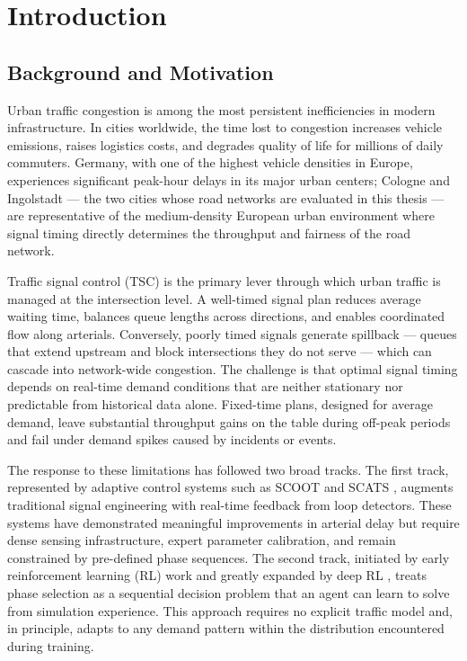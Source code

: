\chapter{Introduction}
\label{ch:Introduction}

\section{Background and Motivation}
\label{sec:Introduction_BackgroundAndMotivation}

Urban traffic congestion is among the most persistent inefficiencies in modern infrastructure. In cities worldwide, the time lost to congestion increases vehicle emissions, raises logistics costs, and degrades quality of life for millions of daily commuters. Germany, with one of the highest vehicle densities in Europe, experiences significant peak-hour delays in its major urban centers; Cologne and Ingolstadt — the two cities whose road networks are evaluated in this thesis — are representative of the medium-density European urban environment where signal timing directly determines the throughput and fairness of the road network.

Traffic signal control (TSC) is the primary lever through which urban traffic is managed at the intersection level. A well-timed signal plan reduces average waiting time, balances queue lengths across directions, and enables coordinated flow along arterials. Conversely, poorly timed signals generate spillback — queues that extend upstream and block intersections they do not serve — which can cascade into network-wide congestion. The challenge is that optimal signal timing depends on real-time demand conditions that are neither stationary nor predictable from historical data alone. Fixed-time plans, designed for average demand, leave substantial throughput gains on the table during off-peak periods and fail under demand spikes caused by incidents or events.

The response to these limitations has followed two broad tracks. The first track, represented by adaptive control systems such as SCOOT \citep{hunt1981scoot} and SCATS \citep{lowrie1990scats}, augments traditional signal engineering with real-time feedback from loop detectors. These systems have demonstrated meaningful improvements in arterial delay but require dense sensing infrastructure, expert parameter calibration, and remain constrained by pre-defined phase sequences. The second track, initiated by early reinforcement learning (RL) work \citep{wiering2000multiagent} and greatly expanded by deep RL \citep{wei2018intellilight,wei2019presslight}, treats phase selection as a sequential decision problem that an agent can learn to solve from simulation experience. This approach requires no explicit traffic model and, in principle, adapts to any demand pattern within the distribution encountered during training.

